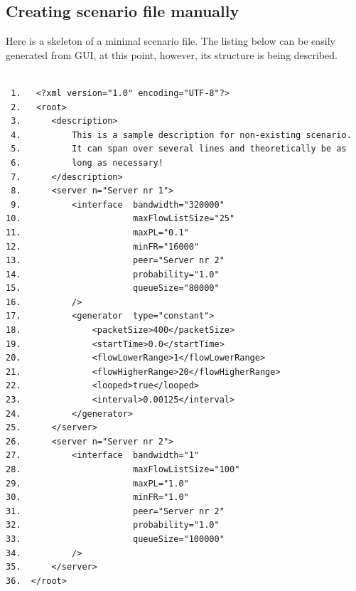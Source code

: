 \documentclass[a4paper,12pt]{article}
\begin{document}
   \subsection{Creating scenario file manually}

    Here is a skeleton of a minimal scenario file. The listing below can be
    easily generated from GUI, at this point, however, its structure is 
   being described.
    \begin{verbatim}

 1.   <?xml version="1.0" encoding="UTF-8"?>
 2.   <root>
 3.      <description>
 4.          This is a sample description for non-existing scenario.
 5.          It can span over several lines and theoretically be as
 6.          long as necessary!
 7.      </description>
 8.      <server n="Server nr 1">
 9.          <interface	 bandwidth="320000"
10.                      maxFlowListSize="25"
11.                      maxPL="0.1"
12.                      minFR="16000"
13.                      peer="Server nr 2"
14.                      probability="1.0"
15.                      queueSize="80000"
16.          />
17.          <generator  type="constant">
18.              <packetSize>400</packetSize>
19.              <startTime>0.0</startTime>
20.              <flowLowerRange>1</flowLowerRange>
21.              <flowHigherRange>20</flowHigherRange>
22.              <looped>true</looped>
23.              <interval>0.00125</interval>
24.          </generator>
25.      </server>
26.      <server n="Server nr 2">
27.          <interface  bandwidth="1" 
28.                      maxFlowListSize="100"
29.                      maxPL="1.0"
30.                      minFR="1.0"
31.                      peer="Server nr 2"
32.                      probability="1.0"
33.                      queueSize="100000"
34.          />
35.      </server>
36.  </root> 

	\end{verbatim}
\end{document}
